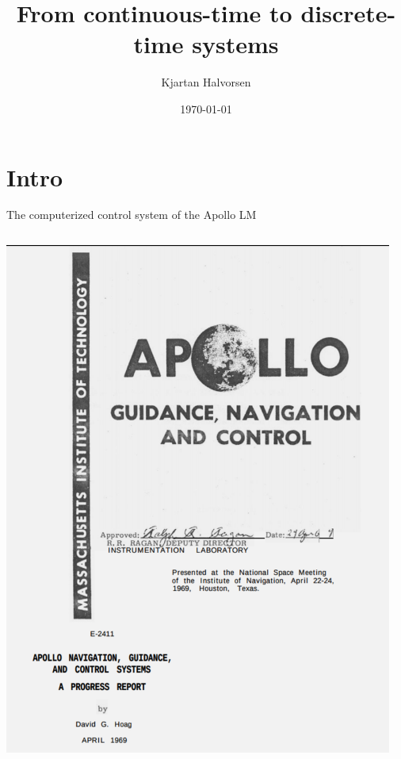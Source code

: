 \documentclass[presentation,aspectratio=169]{beamer}
\author{Kjartan Halvorsen}
\date{\today}
\title{From continuous-time to discrete-time systems}
\begin{document}
\maketitle

\section{Intro}
\label{sec:orgf5ea9d3}

\begin{frame}[label={sec:org6974285}]{The computerized control system of the Apollo LM}
\begin{columns}
\begin{column}{0.3\columnwidth}
\begin{center}
 \includegraphics[width=1.0\linewidth]{../../figures/Hoag-report-1.png}
\end{center}
\end{column}
\begin{column}{0.7\columnwidth}
\pause


\end{column}
\end{columns}
\end{frame}
\end{document}
